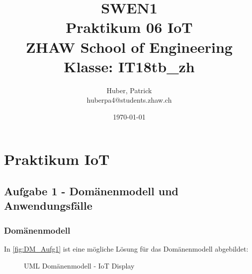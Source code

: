 \documentclass[11pt,ngerman]{article}
\begin{document}
    \title{SWEN1\\Praktikum 06 IoT\\
        \vspace{1cm}
        \small{ZHAW  School of Engineering\\Klasse: IT18tb\_zh}
        \vspace{1.5cm}
    }
    \author{
        Huber, Patrick\\
        \small{huberpa4@students.zhaw.ch}
        \vspace{1.5cm}
    }
   \date{\today}

    \maketitle
    \newpage

    \tableofcontents
    \listoffigures
    \newpage

    \section{Praktikum IoT}

    \subsection{Aufgabe 1 - Domänenmodell und Anwendungsfälle}
    \label{ssec:Aufg1}

    \subsubsection{Domänenmodell}
    In \autoref{fig:DM_Aufg1} ist eine mögliche Lösung für das Domänenmodell abgebildet:
    \begin{figure}[H]
        \centering
        \caption{UML Domänenmodell - IoT Display}
        \label{fig:DM_Aufg1}
    \end{figure}
\end{document}
